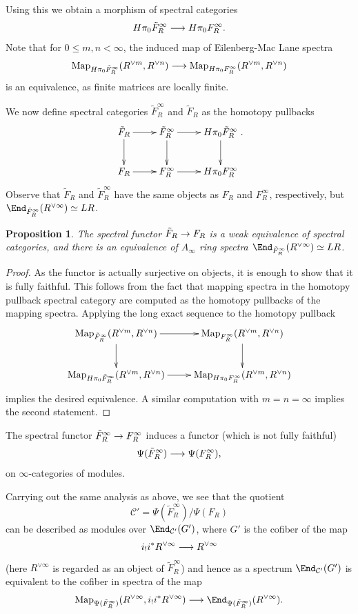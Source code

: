\documentclass{amsart}
\renewcommand{\to}{\mathchoice{\longrightarrow}{\rightarrow}{\rightarrow}{\rightarrow}}
\let\catsymbfont\mathcal
\newcommand{\aC}{{\catsymbfont{C}}}
\newcommand{\Map}{\mathrm{Map}}%
\renewcommand{\i}{\infty}
\numberwithin{equation}{section}
\newtheorem{proposition}[equation]{Proposition}
\theoremstyle{definition}
\begin{document}
Using this we obtain a morphism of spectral categories
\[
H\pi_0\tilde{F}_R^\infty\to H\pi_0 F_R^\infty.
\]
Note that for $0\leq m,n<\infty$, the induced map of Eilenberg-Mac Lane spectra
\[
\Map_{H\pi_0\tilde{F}_R^\infty}(R^{\lor m},R^{\lor n})\to\Map_{H\pi_0 F_R^\infty}(R^{\lor m},R^{\lor n})
\]
is an equivalence, as finite matrices are locally finite.

We now define spectral categories $\tilde{F}^\infty_R$ and $\tilde{F}_R$ as the homotopy pullbacks
\[
\xymatrix{
\tilde{F}_R\ar[r]\ar[d] & \tilde{F}^\infty_R\ar[r]\ar[d] & H\pi_0\tilde{F}^\infty_R\ar[d]\\
F_R\ar[r] & F^\infty_R\ar[r] & H\pi_0 F^\infty_R}.
\]
Observe that $\tilde{F}_R$ and $\tilde{F}^\infty_R$ have the same objects
as $F_R$ and $F^\infty_R$, respectively, but
$\End_{\tilde{F}^\infty_R}(R^{\lor\infty})\simeq LR$.

\begin{proposition}
The spectral functor $\tilde{F}_R\to F_R$ is a weak equivalence of
spectral categories, and there is an equivalence of $A_\infty$ ring
spectra $\End_{\tilde{F}^\infty_R}(R^{\lor\infty})\simeq LR$.
\end{proposition}

\begin{proof}
As the functor is actually surjective on objects, it is enough to show
that it is fully faithful.  This follows from the fact that mapping
spectra in the homotopy pullback spectral category are computed as the
homotopy pullbacks of the mapping spectra.  Applying the long exact
sequence to the homotopy pullback  
\[
\xymatrix{
\Map_{\tilde{F}^\infty_R}(R^{\lor m},R^{\lor n})\ar[r]\ar[d] & \Map_{{F}^\infty_R}(R^{\lor m},R^{\lor n})\ar[d]\\
\Map_{H\pi_0\tilde{F}^\infty_R}(R^{\lor m},R^{\lor n})\ar[r] & \Map_{H\pi_0{F}^\infty_R}(R^{\lor m},R^{\lor n})}
\]
implies the desired equivalence.  A similar computation with
$m=n=\infty$ implies the second statement.
\end{proof}

The spectral functor $\tilde{F}^\infty_R\to F^\infty_R$ induces a
functor (which is not fully faithful) 
\[
\Psi(\tilde{F}_R^{\infty}) \to \Psi(F_R^{\infty}), 
\]
on $\i$-categories of modules.

Carrying out the same analysis as above, we see that the
quotient 
\[
\aC' = \Psi(\tilde{F}_R^{\infty}) / \Psi(F_R)
\]
can be described as modules over $\End_{\aC'}(G')$, where $G'$ is the
cofiber of the map
\[
i_! i^* R^{\lor \infty} \to R^{\lor \infty}
\]
(here $R^{\lor \infty}$ is regarded as an object of
$\tilde{F}_R^{\infty}$) and hence as a spectrum $\End_{\aC'}(G')$ is
equivalent to the cofiber in spectra of the map
\begin{equation}\label{eqn:cofib}
\Map_{\Psi(\tilde{F}_R^{\infty})}(R^{\lor \infty}, i_! i^*
R^{\lor \infty}) \to \End_{\Psi(\tilde{F}_R^{\infty})}(R^{\lor \infty}).
\end{equation}
\end{document}
